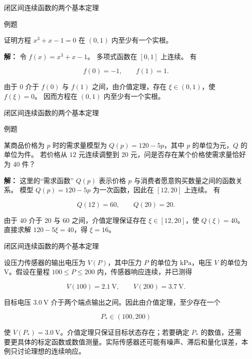 \documentclass[aspectratio=169,10pt,fontset=fandol]{ctexbeamer}
\begin{document}
\begin{frame}[t,fragile]{闭区间连续函数的两个基本定理}
\normalsize
\begin{block}{例题}
{\normalsize
证明方程 $x^3+x-1=0$ 在 $(0,1)$ 内至少有一个实根。


}
\end{block}
\pause
{\normalsize
\textbf{解：}
令 $f(x)=x^3+x-1$。 多项式函数在 $[0,1]$ 上连续。 有

\[

f(0)=-1,\qquad f(1)=1.

\]

由于 $0$ 介于 $f(0)$ 与 $f(1)$ 之间，由介值定理，存在 $\xi\in(0,1)$，使 $f(\xi)=0$。 因而方程在 $(0,1)$ 内至少有一个实根。


}
\end{frame}
\begin{frame}[t,fragile]{闭区间连续函数的两个基本定理}
\normalsize
\begin{block}{例题}
{\normalsize
某商品价格为 $p$ 时的需求量模型为 $Q(p)=120-5p$，其中 $p$ 的单位为元，$Q$ 的单位为件。 若价格从 $12$ 元连续调整到 $20$ 元，问是否存在某个价格使需求量恰好为 $40$ 件？


}
\end{block}
\pause
{\normalsize
\textbf{解：}
这里的“需求函数” $Q(p)$ 表示价格 $p$ 与消费者愿意购买数量之间的函数关系。 模型 $Q(p)=120-5p$ 为一次函数，因此在 $[12,20]$ 上连续。 有

\[

Q(12)=60,\qquad Q(20)=20.

\]

由于 $40$ 介于 $20$ 与 $60$ 之间，介值定理保证存在 $\xi\in[12,20]$，使 $Q(\xi)=40$。 直接求解 $120-5\xi=40$，得 $\xi=16$。


}
\end{frame}
\begin{frame}[t,fragile]{闭区间连续函数的两个基本定理}
\normalsize
{\normalsize
\begin{application}[工程：传感器标定与介值定理]

设压力传感器的输出电压为 $V(P)$，其中压力 $P$ 的单位为 $\mathrm{kPa}$，电压 $V$ 的单位为 $\mathrm V$。假设在量程 $100\leq P\leq200$ 内，传感器响应连续，并已测得

\[

V(100)=2.1\ \mathrm V,\qquad V(200)=3.7\ \mathrm V.

\]

目标电压 $3.0\ \mathrm V$ 介于两个端点输出之间。因此由介值定理，至少存在一个

\[

P_*\in(100,200)

\]

使 $V(P_*)=3.0\ \mathrm V$。介值定理只保证目标状态存在；若要确定 $P_*$ 的数值，还需要更具体的标定函数或数值测量。实际传感器还可能有噪声、滞后和量化误差，本例只讨论理想的连续响应。

\end{application}
}
\end{frame}
\end{document}

